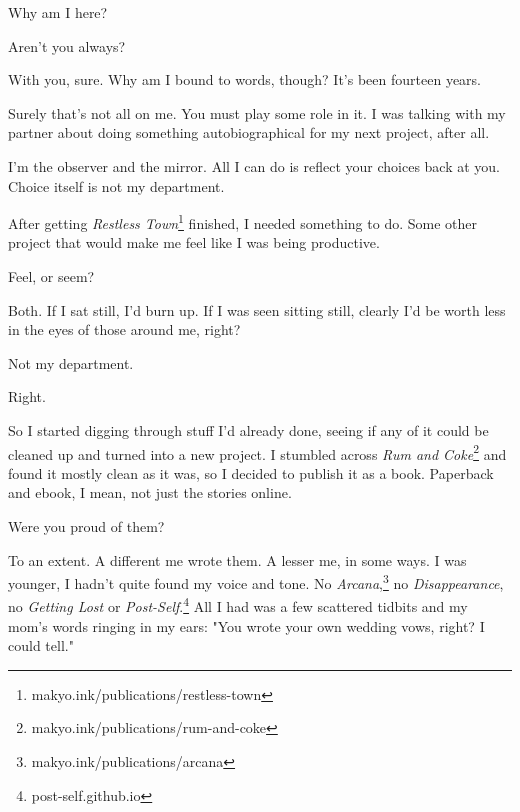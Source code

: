 \label{ally:4}
\begin{paracol}{2}
  \begin{leftcolumn}
\begin{ally}
Why am I here?
\end{ally}
Aren't you always?

\begin{ally}
With you, sure. Why am I bound to words, though? It's been fourteen years.
\end{ally}
Surely that's not all on me. You must play some role in it. I was talking with my partner about doing something autobiographical for my next project, after all.

\begin{ally}
I'm the observer and the mirror. All I can do is reflect your choices back at you. Choice itself is not my department.
\end{ally}
After getting \emph{Restless Town}\footnote{makyo.ink/publications/restless-town} finished, I needed something to do. Some other project that would make me feel like I was being productive.

\begin{ally}
Feel, or seem?
\end{ally}
Both. If I sat still, I'd burn up. If I was seen sitting still, clearly I'd be worth less in the eyes of those around me, right?

\begin{ally}
Not my department.
\end{ally}
Right.

So I started digging through stuff I'd already done, seeing if any of it could be cleaned up and turned into a new project. I stumbled across \emph{Rum and Coke}\footnote{makyo.ink/publications/rum-and-coke} and found it mostly clean as it was, so I decided to publish it as a book. Paperback and ebook, I mean, not just the stories online.

\begin{ally}
Were you proud of them?
\end{ally}
To an extent. A different me wrote them. A lesser me, in some ways. I was younger, I hadn't quite found my voice and tone. No \emph{Arcana},\footnote{makyo.ink/publications/arcana} no \emph{Disappearance}, no \emph{Getting Lost} or \emph{Post-Self}.\footnote{post-self.github.io} All I had was a few scattered tidbits and my mom's words ringing in my ears: "You wrote your own wedding vows, right? I could tell."


\end{leftcolumn}
\end{paracol}
